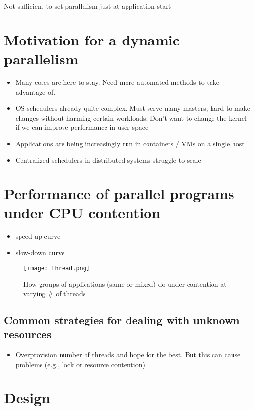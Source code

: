 \documentclass[10pt,preprint]{sigplanconf}
\begin{document}
Not sufficient to set parallelism just at application start


\section{Motivation for a dynamic parallelism}
\begin{itemize}
  \item Many cores are here to stay. Need more automated methods to take advantage of. \cite{baumann2009multikernel}
  \item OS schedulers already quite complex. Must serve many masters; hard to make changes without harming certain workloads. Don't want to change the kernel if we can improve performance in user space \cite{lozi2016linux}
  \item Applications are being increasingly run in containers / VMs on a single host
  \item Centralized schedulers in distributed systems struggle to scale \cite{ousterhout2013sparrow}
\end{itemize}

\section{Performance of parallel programs under CPU contention}

\begin{itemize}
  \item speed-up curve
  \item slow-down curve
\end{itemize}

\begin{figure}
\centering
  \texttt{[image: thread.png]}
  \caption{How groups of applications (same or mixed) do under contention at varying \# of threads}
\end{figure}

\subsection{Common strategies for dealing with unknown resources}
\begin{itemize}
  \item Overprovision number of threads and hope for the best. But this can cause problems (e.g., lock or resource contention)
\end{itemize}

\section{Design}
\end{document}
